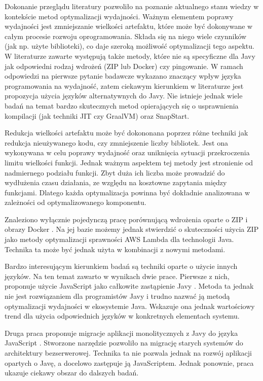 Dokonanie przeglądu literatury pozwoliło na poznanie aktualnego stanu wiedzy w kontekście metod optymalizacji wydajności.
Ważnym elementem poprawy wydajności jest zmniejszanie wielkości artefaktu, które może być dokonywane w całym procesie rozwoju oprogramowania.
Składa się na niego wiele czynników (jak np. użyte biblioteki), co daje szeroką możliwość optymalizacji tego aspektu.
W literaturze zawarte występują także metody, które nie są specyficzne dla Javy jak odpowiedni rodzaj wdrożeń (ZIP lub Docker) czy pingowanie.
W ramach odpowiedzi na pierwsze pytanie badawcze wykazano znaczący wpływ języka programowania na wydajność, zatem ciekawym kierunkiem w literaturze jest propozycja użycia języków alternatywnych do Javy.
Nie istnieje jednak wiele badań na temat bardzo skutecznych metod opierających się o usprawnienia kompilacji (jak techniki JIT czy GraalVM) oraz SnapStart.

Redukcja wielkości artefaktu może być dokononana poprzez różne techniki jak redukcja nieużywanego kodu, czy zmniejszenie liczby bibliotek.
Jest ona wykonywana w celu poprawy wydajność oraz uniknięcia sytuacji przekroczenia limitu wielkości funkcji.
Jednak ważnym aspektem tej metody jest stronienie od nadmiernego podziału funkcji.
Zbyt duża ich liczba może prowadzić do wydłużenia czasu działania, ze względu na kosztowne zapytania między funkcjami.
Dlatego każda optymalizacja powinna być dokładnie analizowana w zależności od optymalizowanego komponentu.

Znaleziono wyłącznie pojedynczą pracę porównującą wdrożenia oparte o ZIP i obrazy Docker \cite{9860368}.
Na jej bazie możemy jednak stwierdzić o skuteczności użycia ZIP jako metody optymalizacji sprawności AWS Lambda dla technologii Java.
Technika ta może być jednak użyta w kombinacji z nowymi metodami.

Bardzo interesującym kierunkiem badań są techniki oparte o użycie innych języków.
Na ten temat zawarto w wynikach dwie prace.
Pierwsze z nich, proponuje użycie JavaScript jako całkowite zastąpienie Javy \cite{FerreiraDosSantos2023}.
Metoda ta jednak nie jest rozwiązaniem dla programistów Javy i trudno nazwać ją metodą optymalizacji wydajności w ekosystemie Java.
Wskazuje ona jednak wartościowy trend dla użycia odpowiednich języków w konkretnych elementach systemu.

Druga praca proponuje migracje aplikacji monolitycznych z Javy do języka JavaScript \cite{8844428}.
Stworzone narzędzie pozwoliło na migrację starych systemów do architektury bezserwerowej.
Technika ta nie pozwala jednak na rozwój aplikacji opartych o Javę, a docelowo zastępuje ją JavaScriptem.
Jednak ponownie, praca ukazuje ciekawy obszar do dalszych badań.

